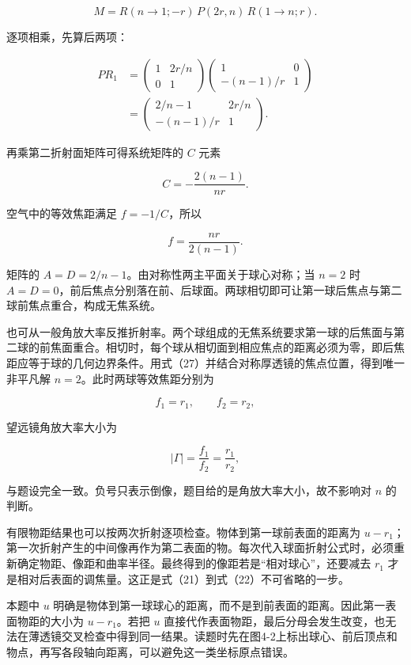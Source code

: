 \documentclass[12pt,a4paper,UTF8]{ctexart}
\begin{document}
\[
M=R(n\to1;-r)\,P(2r,n)\,R(1\to n;r). \tag{24}
\]

逐项相乘，先算后两项：

\[
\begin{aligned}
P R_1
&=
\begin{pmatrix}
1&2r/n\\0&1
\end{pmatrix}
\begin{pmatrix}
1&0\\-(n-1)/r&1
\end{pmatrix}\\
&=
\begin{pmatrix}
2/n-1&2r/n\\
-(n-1)/r&1
\end{pmatrix}.
\end{aligned} \tag{25}
\]

再乘第二折射面矩阵可得系统矩阵的 \(C\) 元素

\[
C=-\frac{2(n-1)}{nr}. \tag{26}
\]

空气中的等效焦距满足 \(f=-1/C\)，所以

\[
f=\frac{nr}{2(n-1)}. \tag{27}
\]

矩阵的 \(A=D=2/n-1\)。由对称性两主平面关于球心对称；当 \(n=2\) 时
\(A=D=0\)，前后焦点分别落在前、后球面。两球相切即可让第一球后焦点与第二球前焦点重合，构成无焦系统。

也可从一般角放大率反推折射率。两个球组成的无焦系统要求第一球的后焦面与第二球的前焦面重合。相切时，每个球从相切面到相应焦点的距离必须为零，即后焦距应等于球的几何边界条件。用式（27）并结合对称厚透镜的焦点位置，得到唯一非平凡解
\(n=2\)。此时两球等效焦距分别为

\[
f_1=r_1,
\qquad
f_2=r_2, \tag{28}
\]

望远镜角放大率大小为

\[
|\Gamma|=\frac{f_1}{f_2}=\frac{r_1}{r_2}, \tag{29}
\]

与题设完全一致。负号只表示倒像，题目给的是角放大率大小，故不影响对 \(n\)
的判断。

有限物距结果也可以按两次折射逐项检查。物体到第一球前表面的距离为
\(u-r_1\)；第一次折射产生的中间像再作为第二表面的物。每次代入球面折射公式时，必须重新确定物距、像距和曲率半径。最终得到的像距若是``相对球心''，还要减去
\(r_1\) 才是相对后表面的调焦量。这正是式（21）到式（22）不可省略的一步。

本题中 \(u\)
明确是物体到第一球球心的距离，而不是到前表面的距离。因此第一表面物距的大小为
\(u-r_1\)。若把 \(u\)
直接代作表面物距，最后分母会发生改变，也无法在薄透镜交叉检查中得到同一结果。读题时先在图4-2上标出球心、前后顶点和物点，再写各段轴向距离，可以避免这一类坐标原点错误。
\end{document}
